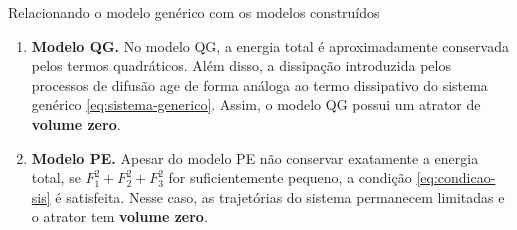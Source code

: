 
\begin{frame}{Relacionando o modelo genérico com os modelos construídos}

\begin{enumerate}
    \item \textbf{Modelo QG.} No modelo QG, a energia total é aproximadamente conservada pelos termos quadráticos. Além disso, a dissipação introduzida pelos processos de difusão age de forma análoga ao termo dissipativo do sistema genérico \eqref{eq:sistema-generico}. Assim, o modelo QG possui um atrator de \textbf{volume zero}.

    
    \item \textbf{Modelo PE.} Apesar do modelo PE não conservar exatamente a energia total, se $F_1^2 +F_2^2+F_3^2$ for suficientemente pequeno, a condição \eqref{eq:condicao-sis} é satisfeita. Nesse caso, as trajetórias do sistema permanecem limitadas e o atrator tem \textbf{volume zero}.
\end{enumerate}

\end{frame}
